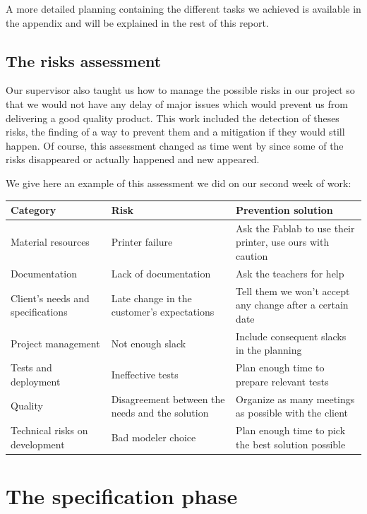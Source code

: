 \documentclass{report}
\begin{document}
A more detailed planning containing the different tasks we achieved is available in the appendix and will be explained in the rest of this report.

\section{The risks assessment}

Our supervisor also taught us how to manage the possible risks in our project so that we would not have any delay of major issues which would prevent us from delivering a good quality product. This work included the detection of theses risks, the finding of a way to prevent them and a mitigation if they would still happen. Of course, this assessment changed as time went by since some of the risks disappeared or actually happened and new appeared.

We give here an example of this assessment we did on our second week of work:

\begin{center}
	\begin{tabular}{|p{4cm}|p{5cm}|p{5cm}|}
		\hline
		Category & Risk & Prevention solution \\ \hline
		Material resources & Printer failure & Ask the Fablab to use their printer, use ours with caution \\
		Documentation & Lack of documentation & Ask the teachers for help \\
		Client's needs and specifications & Late change in the customer's expectations & Tell them we won't accept any change after a certain date \\
		Project management & Not enough slack & Include consequent slacks in the planning \\
		Tests and deployment & Ineffective tests & Plan enough time to prepare relevant tests \\
		Quality & Disagreement between the needs and the solution & Organize as many meetings as possible with the client \\
		Technical risks on development & Bad modeler choice & Plan enough time to pick the best solution possible \\
		\hline
	\end{tabular}
\end{center}

\chapter{The specification phase}
\end{document}
